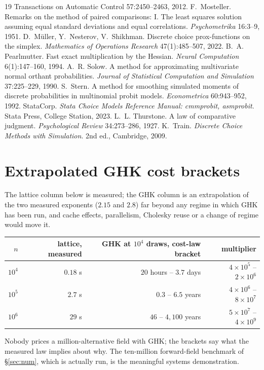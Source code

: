 \documentclass[11pt]{article}
\begin{document}
\begin{thebibliography}{19}
{Transactions on Automatic Control} 57:2450--2463, 2012.
 F.~Mosteller. Remarks on the
method of paired comparisons: I. The least squares solution assuming
equal standard deviations and equal correlations. \emph{Psychometrika}
16:3--9, 1951.
D.~M\"uller, Y.~Nesterov, V.~Shikhman. Discrete choice prox-functions on
the simplex. \emph{Mathematics of Operations Research} 47(1):485--507,
2022.
 B.~A. Pearlmutter.
Fast exact multiplication by the Hessian. \emph{Neural Computation}
6(1):147--160, 1994.
 A.~R. Solow.
A method for approximating multivariate normal orthant probabilities.
\emph{Journal of Statistical Computation and Simulation} 37:225--229, 1990.
 S.~Stern.
A method for smoothing simulated moments of discrete probabilities in
multinomial probit models. \emph{Econometrica} 60:943--952, 1992.
 StataCorp.
\emph{Stata Choice Models Reference Manual: cmmprobit, asmprobit}.
Stata Press, College Station, 2023.
 L.~L. Thurstone.
A law of comparative judgment. \emph{Psychological Review} 34:273--286, 1927.
 K.~Train.
\emph{Discrete Choice Methods with Simulation}. 2nd ed., Cambridge, 2009.
\end{thebibliography}
\appendix
\section{Extrapolated GHK cost brackets}\label{app:extrap}

The lattice column below is measured; the GHK column is an
extrapolation of the two measured exponents ($2.15$ and $2.8$) far
beyond any regime in which GHK has been run, and cache effects,
parallelism, Cholesky reuse or a change of regime would move it.

\begin{center}\small
\begin{tabular}{rrrr}
\toprule
$n$ & lattice, measured & GHK at $10^4$ draws, cost-law bracket & multiplier \\
\midrule
$10^4$ & $0.18$ s & $20$ hours -- $3.7$ days & $4\times10^{5}$ -- $2\times10^{6}$ \\
$10^5$ & $2.7$ s & $0.3$ -- $6.5$ years & $4\times10^{6}$ -- $8\times10^{7}$ \\
$10^6$ & $29$ s & $46$ -- $4{,}100$ years & $5\times10^{7}$ -- $4\times10^{9}$ \\
\bottomrule
\end{tabular}
\end{center}

Nobody prices a million-alternative field with GHK; the brackets say
what the measured law implies about why. The ten-million forward-field
benchmark of \S\ref{sec:num}, which is actually run, is the meaningful
systems demonstration.
\end{document}
